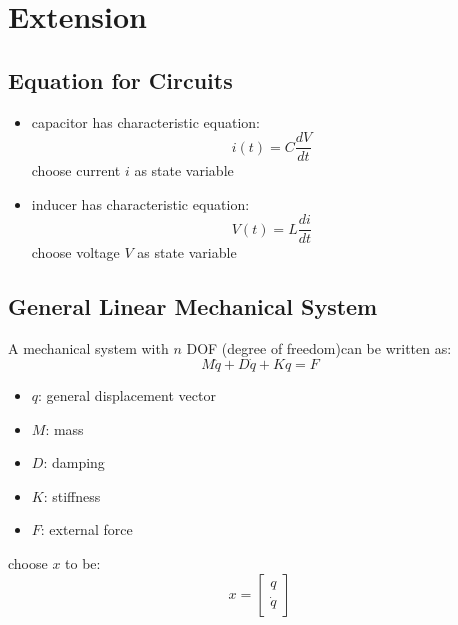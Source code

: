 \documentclass[10pt,a4paper,oneside]{article}
\begin{document}
\section{Extension}
\subsection{Equation for Circuits}
\begin{itemize}
	\item capacitor has characteristic equation:
	\[
	i(t) = C \frac{dV}{dt}
	\]
	choose current $i$ as state variable
	\item inducer has characteristic equation:
	\[
	V(t) = L \frac{di}{dt}
	\]
	choose voltage $V$ as state variable
\end{itemize}
\subsection{General Linear Mechanical System}
A mechanical system with $n$ DOF (degree of freedom)can be written as:
\[
M\ddot{q} + D\dot{q} + Kq = F
\]
\begin{itemize}
	\item $q$: general displacement vector
	\item $M$: mass
	\item $D$: damping
	\item $K$: stiffness
	\item $F$: external force
\end{itemize}
choose $x$ to be:
\[
x = \begin{bmatrix}
q\\
\dot{q}
\end{bmatrix}
\]
\end{document}
